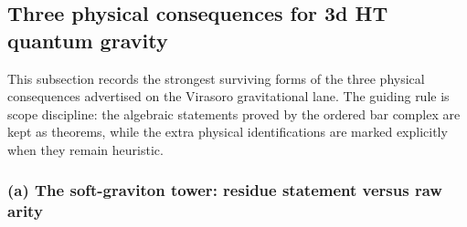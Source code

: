 %
%

\providecommand{\Vir}{\mathrm{Vir}}
\providecommand{\Mel}{\widetilde}
\providecommand{\Res}{\operatorname{Res}}
\providecommand{\Ainf}{A_\infty}
\providecommand{\cD}{\mathcal D}
\providecommand{\cM}{\mathcal M}
\providecommand{\cO}{\mathcal O}
\providecommand{\ClaimStatusProvedHere}{}
\providecommand{\ClaimStatusConjectured}{}
\providecommand{\ClaimStatusHeuristic}{}

\subsection{Three physical consequences for 3d HT quantum gravity}
\label{subsec:gravity-three-physical-consequences}

This subsection records the strongest surviving forms of the three
physical consequences advertised on the Virasoro gravitational lane.
The guiding rule is scope discipline: the algebraic statements proved by
the ordered bar complex are kept as theorems, while the extra physical
identifications are marked explicitly when they remain heuristic.

\subsubsection*{(a) The soft-graviton tower: residue statement versus raw arity}

